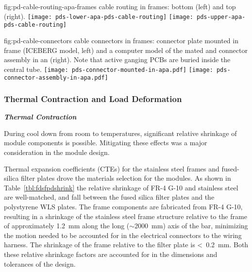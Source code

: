 
\begin{dunefigure}
{fig:pd-cable-routing-apa-frames}
{ cable routing in  frames: bottom  (left) and top  (right).}
	\texttt{[image: pds-lower-apa-pds-cable-routing]}
	\texttt{[image: pds-upper-apa-pds-cable-routing]}
	\vspace{-1.5cm}
\end{dunefigure}


\begin{dunefigure}{fig:pd-cable-connectors}
{ cable connectors in  frames:  connector plate mounted in  frame (ICEBERG model, left) and a computer model of the mated  and connector assembly in an  (right).  Note that active ganging PCBs are buried inside the central tube.}
	\texttt{[image: pds-connector-mounted-in-apa.pdf]}
	\texttt{[image: pds-connector-assembly-in-apa.pdf]}
\end{dunefigure}

\subsubsection{Thermal Contraction and Load Deformation}
\label{sssec:pds-thermal-load}
\textit{\bf Thermal Contraction}

During cool down from room 
to  temperatures,  significant relative shrinkage of module components is possible.  Mitigating these effects was a major consideration in the  module design.

Thermal expansion coefficients (CTEs) for the stainless steel  frames and fused-silica filter plates drove the materials selection for the  modules.  As shown in Table~\ref{tbl:fdsfpdshrink}  the relative shrinkage of FR-4 G-10 and stainless steel are well-matched, and fall between the fused silica filter plates and the polystyrene WLS plates. The frame components are fabricated from FR-4 G-10, resulting in a shrinkage of the stainless steel frame structure relative to the frame of approximately \SI{1.2}{mm} along the long ($\sim$\SI{2000}{mm}) axis of the bar, minimizing the motion needed to be accounted for in the electrical connectors to the wiring harness.  The shrinkage of the frame relative to the filter plate is <~\SI{0.2}{mm}.  Both these relative shrinkage factors are accounted for in the dimensions and tolerances of the design.

